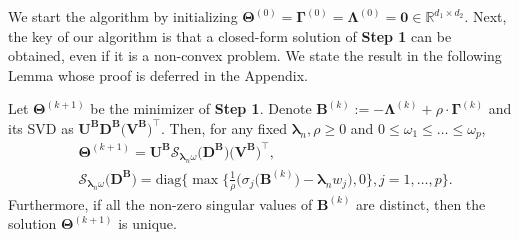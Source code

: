 \documentclass[alpha-refs]{wiley-article}
\begin{document}
We start the algorithm by initializing  $\boldsymbol{\Theta}^{(0)}=\boldsymbol{\Gamma}^{(0)}=\boldsymbol{\Lambda}^{(0)}=\boldsymbol{0} \in\mathbb{R}^{d_{1}\times d_{2}}$.
Next, the key of our algorithm is that a closed-form solution of \textbf{Step 1} can be obtained, even if it is a non-convex problem.
We state the result in the following Lemma whose proof is deferred in the Appendix.
\begin{lemma} \label{Lemma2.1}
    Let $\boldsymbol{\Theta}^{(k+1)}$ be the minimizer of \textbf{Step 1}.
    Denote $\boldsymbol{B}^{(k)}:=-\boldsymbol{\Lambda}^{(k)}+\rho \cdot \boldsymbol{\Gamma}^{(k)}$ and its SVD as $\boldsymbol{U}^{\textbf{B}}\boldsymbol{D}^{\textbf{B}}\big(\boldsymbol{V}^{\textbf{B}}\big)^{\top}$.
    Then, for any fixed $\boldsymbol{\lambda}_{n}, \rho \geq 0 $ and $0\leq \omega_{1} \leq \dots \leq \omega_{p}$,
    \begin{align*}
        &\boldsymbol{\Theta}^{(k+1)} = \boldsymbol{U}^{\textbf{B}}\mathcal{S}_{\boldsymbol{\lambda}_{n}\omega}\big(\boldsymbol{D}^{\textbf{B}}\big)\big(\boldsymbol{V}^{\textbf{B}}\big)^{\top}, \\
        &\mathcal{S}_{\boldsymbol{\lambda}_{n}\omega}\big(\boldsymbol{D}^{\textbf{B}}\big) = \text{diag}\bigg\{ \max\bigg\{\frac{1}{\rho}\big(\sigma_{j}(\boldsymbol{B}^{(k)}\big)-\boldsymbol{\lambda}_{n} w_{j}\big),0 \bigg\},  j=1,\dots,p \bigg\}.
    \end{align*}
    Furthermore, if all the non-zero singular values of $\boldsymbol{B}^{(k)}$ are distinct, then the solution $\boldsymbol{\Theta}^{(k+1)}$ is unique.
\end{lemma}
\end{document}
